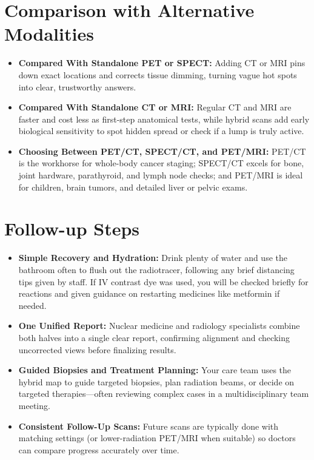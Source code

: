 \section{Comparison with Alternative Modalities}
\begin{itemize}
    \item \textbf{Compared With Standalone PET or SPECT:} Adding CT or MRI pins down exact locations and corrects tissue dimming, turning vague hot spots into clear, trustworthy answers.
    \item \textbf{Compared With Standalone CT or MRI:} Regular CT and MRI are faster and cost less as first-step anatomical tests, while hybrid scans add early biological sensitivity to spot hidden spread or check if a lump is truly active.
    \item \textbf{Choosing Between PET/CT, SPECT/CT, and PET/MRI:} PET/CT is the workhorse for whole-body cancer staging; SPECT/CT excels for bone, joint hardware, parathyroid, and lymph node checks; and PET/MRI is ideal for children, brain tumors, and detailed liver or pelvic exams.
\end{itemize}

\section{Follow-up Steps}
\begin{itemize}
    \item \textbf{Simple Recovery and Hydration:} Drink plenty of water and use the bathroom often to flush out the radiotracer, following any brief distancing tips given by staff. If IV contrast dye was used, you will be checked briefly for reactions and given guidance on restarting medicines like metformin if needed.
    \item \textbf{One Unified Report:} Nuclear medicine and radiology specialists combine both halves into a single clear report, confirming alignment and checking uncorrected views before finalizing results.
    \item \textbf{Guided Biopsies and Treatment Planning:} Your care team uses the hybrid map to guide targeted biopsies, plan radiation beams, or decide on targeted therapies---often reviewing complex cases in a multidisciplinary team meeting.
    \item \textbf{Consistent Follow-Up Scans:} Future scans are typically done with matching settings (or lower-radiation PET/MRI when suitable) so doctors can compare progress accurately over time.
\end{itemize}

